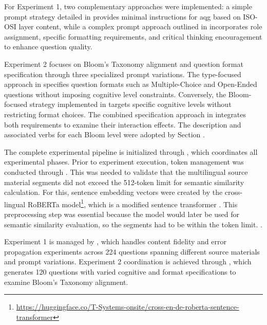 For Experiment 1, two complementary approaches were implemented: a simple prompt strategy detailed in  provides minimal instructions for \ac{aqg} based on ISO-OSI layer content, while a complex prompt approach outlined in  incorporates role assignment, specific formatting requirements, and critical thinking encouragement to enhance question quality.

\pagebreak

Experiment 2 focuses on Bloom's Taxonomy alignment and question format specification through three specialized prompt variations. The type-focused approach in  specifies question formats such as Multiple-Choice and Open-Ended questions without imposing cognitive level constraints. Conversely, the Bloom-focused strategy implemented in  targets specific cognitive levels without restricting format choices. The combined specification approach in  integrates both requirements to examine their interaction effects. The description and associated verbs for each Bloom level were adopted by Section .

The complete experimental pipeline is initialized through , which coordinates all experimental phases. Prior to experiment execution, token management was conducted through . This was needed to validate that the multilingual source material segments did not exceed the 512-token limit for semantic similarity calculation. For this, sentence embedding vectors were created by the cross-lingual RoBERTa model\footnote{\url{https://huggingface.co/T-Systems-onsite/cross-en-de-roberta-sentence-transformer}}, which is a modified sentence transformer \cite{reimers_sentence-bert_2019}. This preprocessing step was essential because the model would later be used for semantic similarity evaluation, so the segments had to be within the token limit. . 

Experiment 1 is managed by , which handles content fidelity and error propagation experiments across 224 questions spanning different source materials and prompt variations. Experiment 2 coordination is achieved through , which generates 120 questions with varied cognitive and format specifications to examine Bloom's Taxonomy alignment. 

